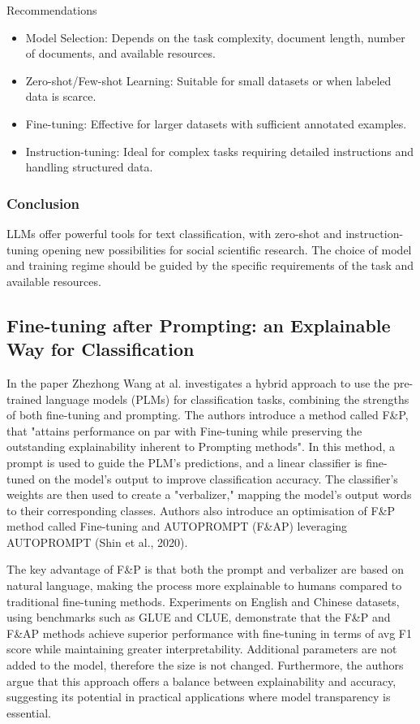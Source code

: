 \documentclass[11pt]{article}
\begin{document}
Recommendations
\begin{itemize}
    \item Model Selection: Depends on the task complexity, document length, number of documents, and available resources.
    \item Zero-shot/Few-shot Learning: Suitable for small datasets or when labeled data is scarce.
    \item Fine-tuning: Effective for larger datasets with sufficient annotated examples.
    \item Instruction-tuning: Ideal for complex tasks requiring detailed instructions and handling structured data.
\end{itemize}

\subsubsection{Conclusion}
LLMs offer powerful tools for text classification, with zero-shot and instruction-tuning opening new possibilities for social scientific research. The choice of model and training regime should be guided by the specific requirements of the task and available resources.


\subsection{Fine-tuning after Prompting: an Explainable Way for Classification}

In the paper Zhezhong Wang at al. investigates a hybrid approach to use the pre-trained language models (PLMs) for classification tasks, combining the strengths of both fine-tuning and prompting. The authors introduce a method called F\&P, that "attains performance on par with Fine-tuning while
preserving the outstanding explainability inherent to Prompting methods". In this method, a prompt is used to guide the PLM's predictions, and a linear classifier is fine-tuned on the model’s output to improve classification accuracy. The classifier's weights are then used to create a "verbalizer," mapping the model's output words to their corresponding classes. Authors also introduce an optimisation of F\&P method called Fine-tuning and AUTOPROMPT (F\&AP) leveraging AUTOPROMPT (Shin et al., 2020).

The key advantage of F\&P is that both the prompt and verbalizer are based on natural language, making the process more explainable to humans compared to traditional fine-tuning methods. Experiments on English and Chinese datasets, using benchmarks such as GLUE and CLUE, demonstrate that the F\&P and F\&AP methods achieve superior performance with fine-tuning in terms of avg F1 score while maintaining greater interpretability. Additional parameters are not added to the model, therefore the size is not changed. Furthermore, the authors argue that this approach offers a balance between explainability and accuracy, suggesting its potential in practical applications where model transparency is essential.
\end{document}

